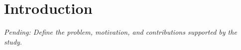 \section{Introduction}
\textit{Pending: Define the problem, motivation, and contributions supported by the study.}
